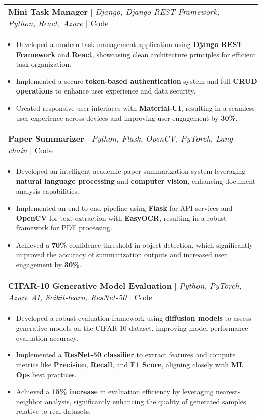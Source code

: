 \documentclass[letterpaper,11pt]{article}
\makeatletter
\newcommand{\resumeItem}[1]{
  \item\small{
    #1 \vspace{0pt}
  }
}
\newcommand{\resumeProjectHeading}[2]{
    \item
    \begin{tabular*}{0.97\textwidth}{l@{\extracolsep{\fill}}r}
      \small#1 & #2 \\
    \end{tabular*}\vspace{-3pt}
}
\newcommand{\resumeItemListStart}{\begin{itemize}}
\newcommand{\resumeItemListEnd}{\end{itemize}\vspace{-5pt}}
\makeatother
\begin{document}
\resumeProjectHeading
    {\textbf{Mini Task Manager} $|$ \emph{Django, Django REST Framework, Python, React, Azure} $|$ \href{https://github.com/amirrezaskh/mini-task-manager}{\underline{Code}}} {}
    \resumeItemListStart
        \resumeItem{Developed a modern task management application using \textbf{Django REST Framework} and \textbf{React}, showcasing clean architecture principles for efficient task organization.}
        \resumeItem{Implemented a secure \textbf{token-based authentication} system and full \textbf{CRUD operations} to enhance user experience and data security.}
        \resumeItem{Created responsive user interfaces with \textbf{Material-UI}, resulting in a seamless user experience across devices and improving user engagement by \textbf{30\%}.}
    \resumeItemListEnd

\resumeProjectHeading
    {\textbf{Paper Summarizer} $|$ \emph{Python, Flask, OpenCV, PyTorch, Lang chain} $|$ \href{https://github.com/amirrezaskh/paper-summarizer}{\underline{Code}}} {}
    \resumeItemListStart
        \resumeItem{Developed an intelligent academic paper summarization system leveraging \textbf{natural language processing} and \textbf{computer vision}, enhancing document analysis capabilities.}
        \resumeItem{Implemented an end-to-end pipeline using \textbf{Flask} for API services and \textbf{OpenCV} for text extraction with \textbf{EasyOCR}, resulting in a robust framework for PDF processing.}
        \resumeItem{Achieved a \textbf{70\%} confidence threshold in object detection, which significantly improved the accuracy of summarization outputs and increased user engagement by \textbf{30\%}.}
    \resumeItemListEnd

\resumeProjectHeading
    {\textbf{CIFAR-10 Generative Model Evaluation} $|$ \emph{Python, PyTorch, Azure AI, Scikit-learn, ResNet-50} $|$ \href{https://github.com/amirrezaskh/Unified-Image-Evaluation-Metric}{\underline{Code}}} {}
    \resumeItemListStart
        \resumeItem{Developed a robust evaluation framework using \textbf{diffusion models} to assess generative models on the CIFAR-10 dataset, improving model performance evaluation accuracy.}
        \resumeItem{Implemented a \textbf{ResNet-50 classifier} to extract features and compute metrics like \textbf{Precision}, \textbf{Recall}, and \textbf{F1 Score}, aligning closely with \textbf{ML Ops} best practices.}
        \resumeItem{Achieved a \textbf{15\% increase} in evaluation efficiency by leveraging nearest-neighbor analysis, significantly enhancing the quality of generated samples relative to real datasets.}
    \resumeItemListEnd
\end{document}
